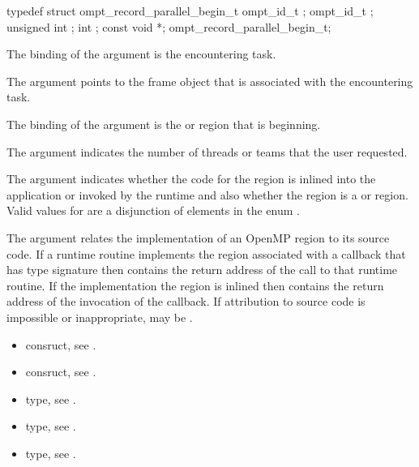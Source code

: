 \record
\begin{ccppspecific}
\begin{omptRecord}
typedef struct ompt_record_parallel_begin_t {
  ompt_id_t ;
  ompt_id_t ;
  unsigned int ;
  int ;
  const void *;
} ompt_record_parallel_begin_t;
\end{omptRecord}
\end{ccppspecific}

\argdesc
The binding of the  argument is the encountering task.

The  argument points to the frame object that is
associated with the encountering task.

The binding of the  argument is the  or 
region that is beginning.

The  argument indicates the number of threads or 
teams that the user requested.

The  argument indicates whether the code for the region is inlined 
into the application or invoked by the runtime and also whether the region is 
a  or  region. Valid values for  are a 
disjunction of elements in the enum .

The  argument relates the implementation of an OpenMP region 
to its source code. If a runtime routine implements the region associated with 
a callback that has type signature  then 
 contains the return address of the call to that runtime routine.  
If the implementation the region is inlined then  contains the
return address of the invocation of the callback. If attribution to source code 
is impossible or inappropriate,  may be .

\crossreferences
\begin{itemize}
\item {} consruct, see .

\item {} consruct, see .

\item {} type, see .

\item {} type, see .

\item {} type, see .
\end{itemize}



